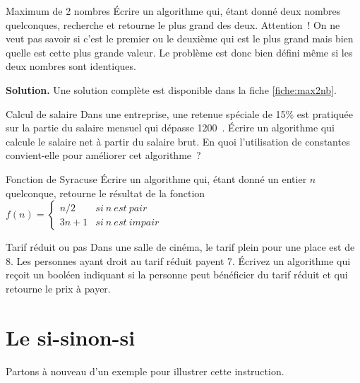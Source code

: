 	\begin{Exercice}{Maximum de 2 nombres}
		Écrire un algorithme qui, étant donné deux nombres quelconques,
		recherche et retourne le plus grand des deux. Attention~! On ne veut
		pas savoir si c’est le premier ou le deuxième qui est
		le plus grand mais bien quelle est cette plus grande valeur. Le
		problème est donc bien défini même si les deux nombres sont
		identiques.
		
		\textbf{Solution.}
		Une solution complète est disponible dans la fiche \vref{fiche:max2nb}.
	\end{Exercice}
	
	\begin{Exercice}{Calcul de salaire}
		Dans une entreprise, 
		une retenue spéciale de 15\% est pratiquée 
		sur la partie du salaire mensuel qui dépasse 1200~\texteuro. 
		Écrire un algorithme qui calcule le salaire net à partir du salaire brut. 
		En quoi l’utilisation de constantes convient-elle pour améliorer cet algorithme~?
	\end{Exercice}

	\begin{Exercice}{Fonction de Syracuse}
		Écrire un algorithme qui, étant donné un entier $n$ quelconque,
		retourne le résultat de la fonction
		$f(n)=
			\left\{
			\begin{array}{rl}
				n/2 & si \ n \ est\ pair\\
				3n+1 & si \ n \ est \ impair
			\end{array}
			\right.$
	\end{Exercice}

	\begin{Exercice}{Tarif réduit ou pas}
		Dans une salle de cinéma,
		le tarif plein pour une place est de 8\texteuro{}.
		Les personnes ayant droit au tarif réduit payent 7\texteuro{}.
		Écrivez un algorithme qui reçoit un booléen
		indiquant si la personne peut bénéficier du tarif réduit
		et qui retourne le prix à payer.
	\end{Exercice}

\section{Le si-sinon-si}

	Partons à nouveau d'un exemple pour illustrer cette instruction.
	
